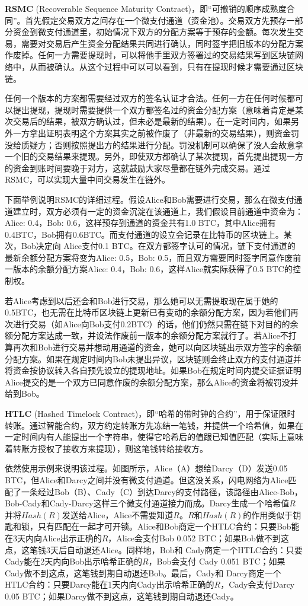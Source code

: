 \documentclass[12pt,a4paper]{article}
\begin{document}
\textbf{RSMC} (Recoverable Sequence Maturity Contract)，即“可撤销的顺序成熟度合同”。首先假定交易双方之间存在一个微支付通道（资金池）。交易双方先预存一部分资金到微支付通道里，初始情况下双方的分配方案等于预存的金额。每次发生交易，需要对交易后产生资金分配结果共同进行确认，同时签字把旧版本的分配方案作废掉。任何一方需要提现时，可以将他手里双方签署过的交易结果写到区块链网络中，从而被确认。从这个过程中可以可以看到，只有在提现时候才需要通过区块链。

任何一个版本的方案都需要经过双方的签名认证才合法。任何一方在任何时候都可以提出提现，提现时需要提供一个双方都签名过的资金分配方案（意味着肯定是某次交易后的结果，被双方确认过，但未必是最新的结果）。在一定时间内，如果另外一方拿出证明表明这个方案其实之前被作废了（非最新的交易结果），则资金罚没给质疑方；否则按照提出方的结果进行分配。罚没机制可以确保了没人会故意拿一个旧的交易结果来提现。另外，即使双方都确认了某次提现，首先提出提现一方的资金到账时间要晚于对方，这就鼓励大家尽量都在链外完成交易。通过 RSMC，可以实现大量中间交易发生在链外。

下面举例说明RSMC的详细过程。假设Alice和Bob需要进行交易，那么在微支付通道建立时，双方必须有一定的资金沉淀在该通道上，我们假设目前通道中资金为：Alice: 0.4，Bob: 0.6，这样预存到通道的资金共有1.0 BTC，其中Alice拥有0.4BTC，Bob拥有0.6BTC。而支付通道的设立会记录在比特币的区块链上。某次，Bob决定向 Alice支付0.1 BTC。在双方都签字认可的情况，链下支付通道的最新余额分配方案将变为{Alice: 0.5，Bob: 0.5}，而且双方需要同时签字同意作废前一版本的余额分配方案{Alice: 0.4，Bob: 0.6}，这样Alice就实际获得了0.5 BTC的控制权。

若Alice考虑到以后还会和Bob进行交易，那么她可以无需提取现在属于她的0.5BTC，也无需在比特币区块链上更新已有变动的余额分配方案，因为若他们再次进行交易（如Alice向Bob支付0.2BTC）的话，他们仍然只需在链下对目的的余额分配方案达成一致，并设法作废前一版本的余额分配方案就行了。若Alice不打算再次和Bob进行交易并想动用通道的资金，她可以向区块链出示双方签字的余额分配方案。如果在规定时间内Bob未提出异议，区块链则会终止双方的支付通道并将资金按协议转入各自预先设立的提现地址。如果Bob在规定时间内提交证据证明Alice提交的是一个双方已同意作废的余额分配方案，那么Alice的资金将被罚没并给到Bob。

\textbf{HTLC} (Hashed Timelock Contract)，即“哈希的带时钟的合约”，用于保证限时转账。通过智能合约，双方约定转账方先冻结一笔钱，并提供一个哈希值，如果在一定时间内有人能提出一个字符串，使得它哈希后的值跟已知值匹配（实际上意味着转账方授权了接收方来提现），则这笔钱转给接收方。

依然使用示例来说明该过程。如图所示，Alice（A）想给Darcy（D）发送0.05 BTC，但Alice和Darcy之间并没有微支付通道。但这没关系，闪电网络为Alice匹配了一条经过Bob（B）、Cady（C）到达Darcy的支付路径，该路径由Alice-Bob，Bob-Cady和Cady-Darcy这样三个微支付通道接力而成。Darcy生成一个哈希值$R$并将$Hash(R)$发送给Alice，Alice不需要知道$R$。$R$和$Hash(R)$的作用类似于钥匙和锁，只有匹配在一起才可开锁。Alice和Bob商定一个HTLC合约：只要Bob能在3天内向Alice出示正确的$R$，Alice会支付Bob 0.052 BTC；如果Bob做不到这点，这笔钱3天后自动退还Alice。同样地，Bob和 Cady商定一个HTLC合约：只要Cady能在2天内向Bob出示哈希正确的$R$，Bob会支付 Cady 0.051 BTC；如果Cady做不到这点，这笔钱到期自动退还Bob。最后，Cady和 Darcy商定一个HTLC合约：只要Darcy能在1天内向Cady出示哈希正确的$R$，Cady会支付Darcy 0.05 BTC；如果Darcy做不到这点，这笔钱到期自动退还Cady。
\end{document}
